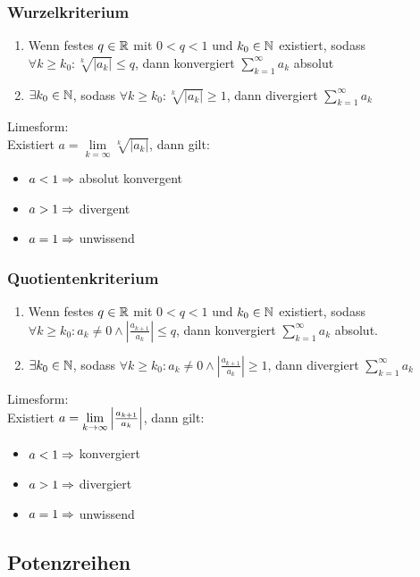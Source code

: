 \subsubsection*{Wurzelkriterium}
\begin{enumerate}
    \item Wenn festes $q \in \mathbb R$ mit $0 < q < 1$ und $k_0 \in \mathbb N$ existiert, sodass $\forall k \geq k_0: \sqrt[k]{|a_k|} \leq q$, dann konvergiert $\sum\limits_{k = 1}^\infty a_k$ absolut
    \item $\exists k_0 \in \mathbb N$, sodass $\forall k \geq k_0: \sqrt[k]{|a_k|} \geq 1$, dann divergiert $\sum\limits_{k = 1}^\infty a_k$
\end{enumerate}
Limesform:\\
Existiert $a = \lim\limits_{k = \infty} \sqrt[k]{|a_k|}$, dann gilt:
\begin{itemize}[leftmargin = *, noitemsep]
    \item $a < 1 \Rightarrow$ absolut konvergent
    \item $a > 1 \Rightarrow$ divergent 
    \item $a = 1 \Rightarrow$ unwissend
\end{itemize}
\subsubsection*{Quotientenkriterium}
\begin{enumerate}[label=\alph*., noitemsep]
    \item Wenn festes $q \in \mathbb R$ mit $0 < q < 1$ und $k_0 \in \mathbb N$ existiert, sodass $\forall k \geq k_0: a_k \neq 0 \land \left| \frac{a_{k+1}}{a_k} \right| \leq q$, dann konvergiert $\sum\limits_{k = 1}^\infty a_k$ absolut.
    \item $\exists k_0 \in \mathbb N$, sodass $\forall k \geq k_0: a_k \neq 0 \land \left| \frac{a_{k+1}}{a_k} \right| \geq 1$, dann divergiert $\sum\limits_{k = 1}^\infty a_k$
\end{enumerate}
Limesform:\\
Existiert $a = \lim\limits_{k \rightarrow \infty} \left| \frac{a_{k+1}}{a_k} \right|$, dann gilt:
\begin{itemize}[leftmargin=*, noitemsep]
    \item $a < 1 \Rightarrow$ konvergiert
    \item $a > 1 \Rightarrow$ divergiert
    \item $a = 1 \Rightarrow $ unwissend 
\end{itemize}
\subsection*{Potenzreihen}
